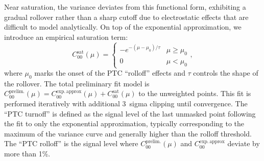Near saturation, the variance deviates from this functional form, exhibiting a gradual rollover rather than a sharp cutoff due to electrostatic effects that are difficult to model analytically.
On top of the exponential approximation, we introduce an empirical saturation term:
\begin{equation}
    C_{00}^{\mathrm{sat}}(\mu) = \left\{
        \begin{array}{ll}
            -e^{-(\mu-\mu_0)/\tau} & \mu \ge \mu_0 \\
            0 & \mu < \mu_0
        \end{array}
    \right.,
\end{equation}
where $\mu_0$ marks the onset of the PTC ``rolloff'' effects and $\tau$ controls the shape of the rollover.
The total preliminary fit model is $C_{00}^{\mathrm{prelim.}}(\mu) = C_{00}^{\mathrm{exp.\,approx}}(\mu) + C_{00}^{\mathrm{sat}}(\mu)$ to the unweighted points. This fit is performed iteratively with additional 3~sigma clipping until convergence.
The ``PTC turnoff'' is defined as the signal level of the last unmasked point following the fit to only the exponential approximation, typically corresponding to the maximum of the variance curve and generally higher than the rolloff threshold.
The ``PTC rolloff'' is the signal level where $C_{00}^{\mathrm{prelim.}}(\mu)$ and $C_{00}^{\mathrm{exp.\,approx}}$ deviate by more than 1\%.

